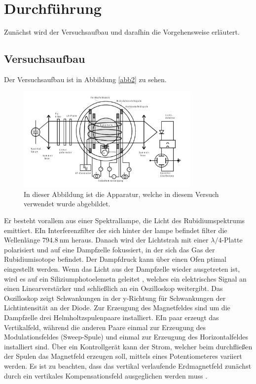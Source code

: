 \section{Durchführung}
\label{sec:Durchführung}

Zunächst wird der Versuchsaufbau und darafhin die Vorgehensweise erläutert.

\subsection{Versuchsaufbau}

Der Versuchsaufbau ist in Abbildung \ref{abb2} zu sehen. 
\begin{figure}
    \centering
    \includegraphics[width=0.8\textwidth]{figure/Aufbau.pdf}
    \caption{In dieser Abbildung ist die Apparatur, welche in diesem Versuch verwendet
    wurde abgebildet. \cite{sample}}
\end{figure}
Er besteht vorallem aus einer Spektrallampe, die Licht des Rubidiumspektrums emittiert.
EIn Interferenzfilter der sich hinter der lampe befindet filter die Wellenlänge
$\SI{794,8}{\nano\meter}$ heraus.
Danach wird der Lichtstrah mit einer $\lambda /4$-Platte polarisiert und auf eine 
Dampfzelle fokussiert, in der sich das Gas der Rubidiumisotope befindet. Der Dampfdruck
kann über einen Ofen ptimal eingestellt werden.
Wenn das Licht aus der Dampfzelle wieder ausgetreten ist, wird es auf ein 
Siliziumphotoelemetn geleitet , welches ein elektrisches Signal an einen 
Linearverstärker und schließlich an ein Oszilloskop weitergibt.
Das Oszilloskop zeigt Schwankungen in der y-Richtung für Schwankungen der 
Lichtintensität an der Diode.
Zur Erzeugung des Magnetfeldes sind um die Dampfzelle drei Helmholtzspulenpaare
installiert. EIn paar erzeugt das Vertikalfeld, während die anderen Paare einmal 
zur Erzeugung des Modulationsfeldes (Sweep-Spule) und einmal zur Erzeugung des 
Horizontalfeldes installiert sind. Über ein Kontrollgerät kann der 
Strom, welcher beim durchfließen der Spulen das Magnetfeld erzeugen soll, mittels 
eines Potentiometeres variiert werden.
Es ist zu beachten, dass das vertikal verlaufende Erdmagnetfeld zunächst durch ein 
vertikales Kompensationsfeld ausgeglichen werden muss \cite{sample}.

